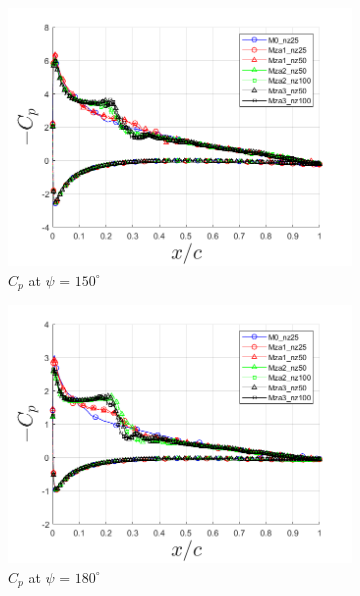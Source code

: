 \begin{figure}[H]
\centering

\begin{subfigure}[b]{0.475\textwidth}
	\centering
	\includegraphics[width=1\textwidth]{figures/zonal_adapt_results/Cp/phase_150.png}
	\caption{ $C_p$ at $\psi$ = $150^\circ$}
	\label{fig:zonal_Cp_150}
\end{subfigure}
\begin{subfigure}[b]{0.475\textwidth}
\centering
\includegraphics[width=1\textwidth]{figures/zonal_adapt_results/Cp/phase_180.png}
\caption{ $C_p$ at $\psi$ = $180^\circ$}
\label{fig:zonal_Cp_180}
\end{subfigure}
\begin{subfigure}[b]{0.475\textwidth}

\end{subfigure}
\end{figure}
